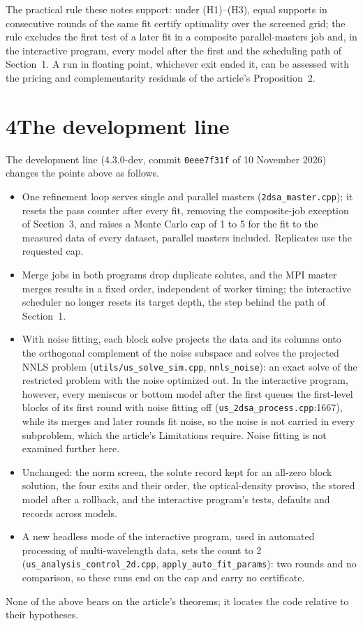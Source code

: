 \documentclass[pdflatex,sn-mathphys-num]{sn-jnl}
\begin{document}
\smallskip
\noindent The practical rule these notes support: under (H1)--(H3),
equal supports in consecutive rounds of the same fit certify
optimality over the screened grid; the rule excludes the first test of
a later fit in a composite parallel-masters job and, in the interactive
program, every model after the first and the scheduling path of
Section~1. A run in floating point, whichever exit ended it, can be
assessed with the pricing and complementarity residuals of the
article's Proposition~2.

\section*{4\quad The development line}

The development line (4.3.0-dev, commit \texttt{0eee7f31f} of
10 November 2026) changes the points above as follows.
\begin{itemize}
\item One refinement loop serves single and parallel masters
  (\texttt{2dsa\_master.cpp}); it resets the pass counter after every
  fit, removing the composite-job exception of Section~3, and raises a
  Monte Carlo cap of 1 to 5 for the fit to the measured data of every
  dataset, parallel masters included. Replicates use the requested cap.
\item Merge jobs in both programs drop duplicate solutes, and the MPI
  master merges results in a fixed order, independent of worker
  timing; the interactive scheduler no longer resets its target depth,
  the step behind the path of Section~1.
\item With noise fitting, each block solve projects the data and its
  columns onto the orthogonal complement of the noise subspace and
  solves the projected NNLS problem (\texttt{utils/us\_solve\_sim.cpp},
  \texttt{nnls\_noise}): an exact solve of the restricted problem with
  the noise optimized out. In the interactive program, however, every
  meniscus or bottom model after the first queues the
  first-level blocks of its first round with noise fitting off
  (\texttt{us\_2dsa\_process.cpp}:1667), while its merges and later
  rounds fit noise, so the noise is not carried in every subproblem,
  which the article's Limitations require. Noise fitting is not
  examined further here.
\item Unchanged: the norm screen, the solute record kept for an all-zero
  block solution, the four exits and their order, the
  optical-density proviso, the stored model after a rollback, and the
  interactive program's tests, defaults and records across models.
\item A new headless mode of the interactive program, used in automated
  processing of multi-wavelength data, sets the count to 2
  (\texttt{us\_analysis\_control\_2d.cpp},
  \texttt{apply\_auto\_fit\_params}): two rounds and no comparison, so
  these runs end on the cap and carry no certificate.
\end{itemize}

\smallskip
\noindent None of the above bears on the article's theorems; it
locates the code relative to their hypotheses.
\end{document}
